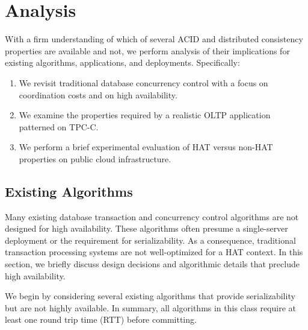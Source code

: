 
\section{Analysis}
\label{sec:evaluation}

With a firm understanding of which of several ACID and distributed
consistency properties are available and not, we perform analysis of
their implications for existing algorithms, applications, and
deployments. Specifically:

\begin{enumerate}
\item We revisit traditional database concurrency control with a focus
  on coordination costs and on high availability.
\item We examine the properties required by a realistic OLTP
  application patterned on TPC-C.
\item We perform a brief experimental evaluation of HAT versus non-HAT
  properties on public cloud infrastructure.
\end{enumerate}

\subsection{Existing Algorithms}

Many existing database transaction and concurrency control algorithms
are not designed for high availability. These algorithms often presume
a single-server deployment or the requirement for serializability. As
a consequence, traditional transaction processing systems are not
well-optimized for a HAT context. In this section, we briefly discuss
design decisions and algorithmic details that preclude high
availability.

We begin by considering several existing algorithms that provide
serializability but are not highly available. In summary, all
algorithms in this class require at least one round trip time (RTT)
before committing.

